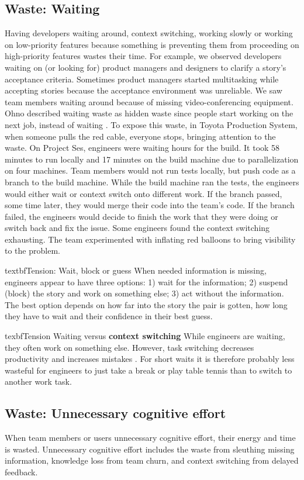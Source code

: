 \subsection{Waste: Waiting}
Having developers waiting around, context switching, working slowly or working on low-priority features because something is preventing them from proceeding on high-priority features wastes their time. For example, we observed developers waiting on (or looking for) product managers and designers to clarify a story's acceptance criteria. Sometimes product managers started multitasking while accepting stories because the acceptance environment was unreliable. We saw team members waiting around because of missing video-conferencing equipment. 
Ohno described waiting waste as hidden waste since people start working on the next job, instead of waiting \cite{OhnoToyotaProductionSystem}. To expose this waste, in Toyota Production System, when someone pulls the red cable, everyone stops, bringing attention to the waste. On Project Ses, engineers were waiting hours for the build. It took 58 minutes to run locally and 17 minutes on the build machine due to parallelization on four machines. Team members would not run tests locally, but push code as a branch to the build machine. While the build machine ran the tests, the engineers would either wait or context switch onto different work. If the branch passed, some time later, they would merge their code into the team's code. If the branch failed, the engineers would decide to finish the work that they were doing or switch back and fix the issue. Some engineers found the context switching exhausting. The team experimented with inflating red balloons to bring visibility to the problem.

textbf{Tension: Wait, block or guess}
When needed information is missing, engineers appear to have three options: 1) wait for the information; 2) suspend (block) the story and work on something else; 3) act without the information. The best option depends on how far into the story the pair is gotten, how long they have to wait and their confidence in their best guess.

texbf{Tension Waiting} versus \textbf{context switching}
While engineers are waiting, they often work on something else. However, task switching decreases productivity and increases mistakes \cite{MonsellTaskSwitching}. For short waits it is therefore probably less wasteful for engineers to just take a break or play table tennis than to switch to another work task. 
\subsection{Waste: Unnecessary cognitive effort}
When team members or users unnecessary cognitive effort, their energy and time is wasted. Unnecessary cognitive effort includes the waste from sleuthing missing information, knowledge loss from team churn, and context switching from delayed feedback.

